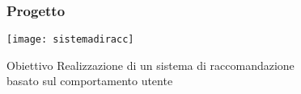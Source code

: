   
\begin{frame}
\frametitle{Progetto}
\begin{minipage}[b][0.5\textheight][t]{\textwidth}
\texttt{[image: sistemadiracc]}
\end{minipage}
\begin{minipage}[b][0.5\textheight][t]{\textwidth}
\begin{alertblock}{Obiettivo}
Realizzazione di un sistema di raccomandazione\\ basato sul comportamento utente
\end{alertblock}
\end{minipage}
\end{frame}